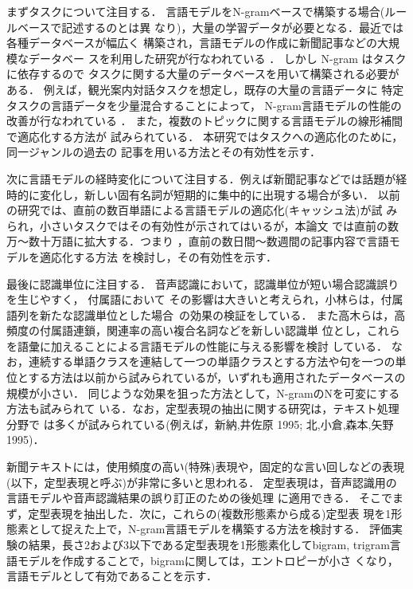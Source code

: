 まずタスクについて注目する．
言語モデルをN-gram\mbox{ベースで構築する場合(ルールベースで}記述するのとは異
なり)，大量の学習データが必要となる．最近では各種データベースが幅広く
構築され，言語モデルの作成に新聞記事などの大規模なデータベー
スを利用した研究が行なわれている \cite{test6}．
しかし N-gram はタスクに依存するので
タスクに関する大量のデータベースを用いて構築される必要がある．
例えば，観光案内対話タスクを想定し，既存の大量の言語データに
特定タスクの言語データを少量混合することによって，
N-gram言語モデルの性能の改善が行なわれている \cite{test7}．
また，複数のトピックに関する言語モデルの線形補間で適応化する方法が
試みられている\cite{test8}．
本研究ではタスクへの適応化のために，同一ジャンルの過去の
記事を用いる方法とその有効性を示す．

次に言語モデルの経時変化について注目する．例えば新聞記事などでは話題が経
時的に変化し，新しい固有名詞が短期的に集中的に出現する場合が多い．
以前の研究では、\mbox{直前の数百単}\mbox{語による言語モデルの適応化(キャッシュ法)が試}
みられ\cite{test20}，\mbox{小さいタスクでは}その有効性が示されてはいるが，本論文
では直前の数万〜数十万語に拡大する．つまり
，直前の数日間〜数週間の記事内容で言語モデルを適応化する方法
を検討し，その有効性を示す．


最後に認識単位に注目する．
音声認識において，\mbox{認識単位が短い場合認識誤りを生じやすく，}
付属語において 
その影響は大きいと考えられ，小林らは，付属語列を新たな認識単位とした場\mbox{合
の効果の検証をしている\cite{test9}}．
\mbox{また高木らは，高頻度の付属語連鎖，}関連率の高い複合名詞などを新しい認識単
位とし，\mbox{これらを語彙に加えることによる言語モデ}ルの性能に与える影響を検討
している\cite{test10}．
なお，連続する単語クラスを連結して一つの単語クラスとする方法や句を一つの単
位とする方法は以前から試みられているが，いずれも適用されたデータベースの
規模が小さい\cite{test11,test12}．
同じような効果を狙った方法として，N-gramのNを可変にする方法も試みられて
いる\cite{test8}．なお，定型表現の抽出に関する研究は，テキスト処理分野で
は多くが試みられている(例えば，新納,井佐原 1995; 北,小倉,森本,矢野 1995)．

新聞テキストには，使用頻度の高い(特殊)表現や，固定的な言い回しなどの表現
(以下，定型表現と呼ぶ)が非常に多いと思われる．
定型表現は，音声認識用の言語モデルや音声認識結果の誤り訂正のための後処理
に適用できる．
そこでまず，定型表現を抽出した．次に，これらの(複数形態素から成る)定型表
現を1形態素として捉えた上で，N-gram言語モデルを構築する方法を検討する．
評価実験の結果，長さ2および3以下である定型表現を1形態素化してbigram, 
trigram言語モデルを作成することで，bigramに関しては，エントロピーが小さ
くなり，言語モデルとして有効であることを示す．


